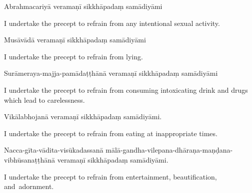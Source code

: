 \begin{precept}
  \setcounter{enumi}{2}
  \item Abrahmacariyā veramaṇī sikkhāpadaṃ samādiyāmi
\end{precept}

\begin{english}
  I undertake the precept to refrain from any intentional sexual activity.
\end{english}

\clearpage

\begin{precept}
  \setcounter{enumi}{3}
  \item Musāvādā veramaṇī sikkhāpadaṃ samādiyāmi
\end{precept}

\begin{english}
  I undertake the precept to refrain from lying.
\end{english}

\begin{precept}
  \setcounter{enumi}{4}
  \item Surāmeraya-majja-pamādaṭṭhānā veramaṇī sikkhāpadaṃ samādiyāmi
\end{precept}

\begin{english}
  I undertake the precept to refrain from consuming intoxicating drink and drugs which lead to carelessness.
\end{english}

\begin{precept}
  \setcounter{enumi}{5}
  \item Vikālabhojanā veramaṇī sikkhāpadaṃ samādiyāmi.
\end{precept}

\begin{english}
  I undertake the precept to refrain from eating at inappropriate times.
\end{english}

\begin{precept}
  \setcounter{enumi}{6}
  \item Nacca-gīta-vādita-visūkadassanā mālā-gandha-vilepana-dhāraṇa-maṇḍana-vibhūsanaṭṭhānā veramaṇī sikkhāpadaṃ samādiyāmi.
\end{precept}

\begin{english}
  I undertake the precept to refrain from entertainment, beautification, and~adornment.
\end{english}


